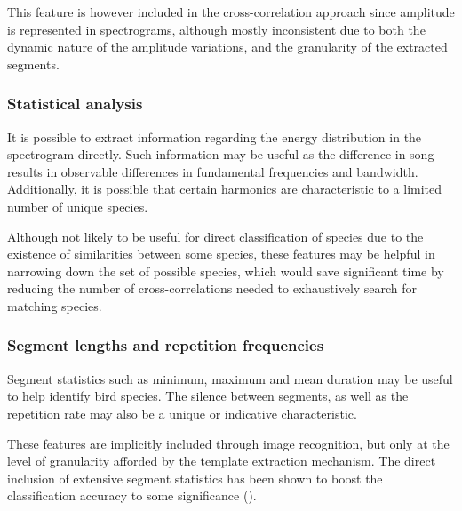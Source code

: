 This feature is however included in the cross-correlation approach since
amplitude is represented in spectrograms, although mostly inconsistent due to
both the dynamic nature of the amplitude variations, and the granularity of the
extracted segments.

\subsubsection{Statistical analysis}
It is possible to extract information regarding the energy distribution in the
spectrogram directly.
Such information may be useful as the difference in song results in observable
differences in fundamental frequencies and bandwidth.
Additionally, it is possible that certain harmonics are characteristic to a
limited number of unique species.

Although not likely to be useful for direct classification of species due to the
existence of similarities between some species, these features may be helpful in
narrowing down the set of possible species, which would save significant time by
reducing the number of cross-correlations needed to exhaustively search for
matching species.

\subsubsection{Segment lengths and repetition frequencies}
Segment statistics such as minimum, maximum and mean duration may be useful to
help identify bird species.
The silence between segments, as well as the repetition rate may also be a
unique or indicative characteristic.

These features are implicitly included through image recognition, but only at
the level of granularity afforded by the template extraction mechanism.
The direct inclusion of extensive segment statistics has been shown to boost
the classification accuracy to some significance (\textcite{lasseck2013}).
